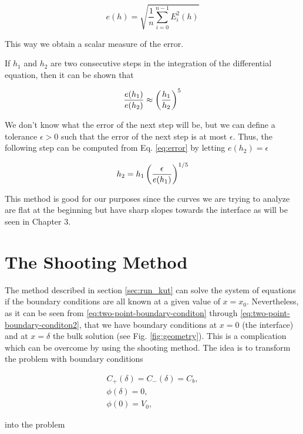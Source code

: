 \begin{equation}
e(h) = \sqrt{\frac{1}{n}\sum_{i=0}^{n-1}E_i^2(h)}
\end{equation}

This way we obtain a scalar measure of the error.

If $h_1$ and $h_2$ are two consecutive steps in the integration of the differential equation, then it can be shown that

\begin{equation}
\frac{e(h_1)}{e(h_2)} \approx \left({\frac{h_1}{h_2}}\right)^5
\label{eq:error}
\end{equation}

We don't know what the error of the next step will be, but we can define a tolerance $\epsilon>0$ such that the error of the next step is at most $\epsilon$. Thus, the following step can be computed from Eq. \ref{eq:error} by letting $e(h_2) = \epsilon$

\begin{equation}
h_2= h_1\left({\frac{\epsilon}{e(h_1)}}\right)^{1/5}
\end{equation}

This method is good for our purposes since the curves we are trying to analyze are flat at the beginning but have sharp slopes towards the interface as will be seen in Chapter 3.

\section{The Shooting Method}
\label{sec:shooting-method}
The method described in section \ref{sec:run_kut} can solve the system of equations if the boundary conditions are all known at a given value of $x = x_0$. Nevertheless, as it can be seen from \ref{eq:two-point-boundary-conditon} through \ref{eq:two-point-boundary-conditon2},
that we have boundary conditions at $x=0$ (the interface) and at $x=\delta$ the bulk solution (see Fig. \ref{fig:geometry}). This is a complication which can be overcome by using the shooting method. The idea is to transform the problem with boundary conditions 

\begin{align}
\label{eq:two-point-boundary-conditon}
	C_+(\delta) = C_-(\delta) = C_b,\\
	\phi(\delta) = 0,\\
	\label{eq:two-point-boundary-conditon2}
	\phi(0) = V_0,
\end{align}


into the problem



